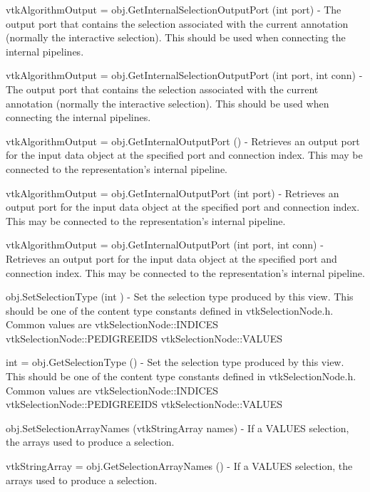 \begin{DoxyItemize}
\item {\ttfamily vtk\-Algorithm\-Output = obj.\-Get\-Internal\-Selection\-Output\-Port (int port)} -\/ The output port that contains the selection associated with the current annotation (normally the interactive selection). This should be used when connecting the internal pipelines.  
\item {\ttfamily vtk\-Algorithm\-Output = obj.\-Get\-Internal\-Selection\-Output\-Port (int port, int conn)} -\/ The output port that contains the selection associated with the current annotation (normally the interactive selection). This should be used when connecting the internal pipelines.  
\item {\ttfamily vtk\-Algorithm\-Output = obj.\-Get\-Internal\-Output\-Port ()} -\/ Retrieves an output port for the input data object at the specified port and connection index. This may be connected to the representation's internal pipeline.  
\item {\ttfamily vtk\-Algorithm\-Output = obj.\-Get\-Internal\-Output\-Port (int port)} -\/ Retrieves an output port for the input data object at the specified port and connection index. This may be connected to the representation's internal pipeline.  
\item {\ttfamily vtk\-Algorithm\-Output = obj.\-Get\-Internal\-Output\-Port (int port, int conn)} -\/ Retrieves an output port for the input data object at the specified port and connection index. This may be connected to the representation's internal pipeline.  
\item {\ttfamily obj.\-Set\-Selection\-Type (int )} -\/ Set the selection type produced by this view. This should be one of the content type constants defined in vtk\-Selection\-Node.\-h. Common values are vtk\-Selection\-Node\-::\-I\-N\-D\-I\-C\-E\-S vtk\-Selection\-Node\-::\-P\-E\-D\-I\-G\-R\-E\-E\-I\-D\-S vtk\-Selection\-Node\-::\-V\-A\-L\-U\-E\-S  
\item {\ttfamily int = obj.\-Get\-Selection\-Type ()} -\/ Set the selection type produced by this view. This should be one of the content type constants defined in vtk\-Selection\-Node.\-h. Common values are vtk\-Selection\-Node\-::\-I\-N\-D\-I\-C\-E\-S vtk\-Selection\-Node\-::\-P\-E\-D\-I\-G\-R\-E\-E\-I\-D\-S vtk\-Selection\-Node\-::\-V\-A\-L\-U\-E\-S  
\item {\ttfamily obj.\-Set\-Selection\-Array\-Names (vtk\-String\-Array names)} -\/ If a V\-A\-L\-U\-E\-S selection, the arrays used to produce a selection.  
\item {\ttfamily vtk\-String\-Array = obj.\-Get\-Selection\-Array\-Names ()} -\/ If a V\-A\-L\-U\-E\-S selection, the arrays used to produce a selection.  

\end{DoxyItemize}
